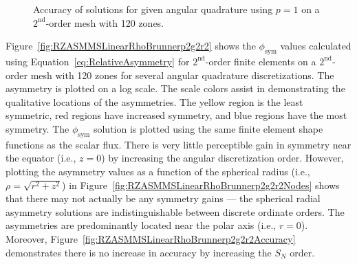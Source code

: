 \documentclass[12pt]{article}
\begin{document}
\begin{figure}[!htb]
\centering
{}
\caption{Accuracy of solutions for given angular quadrature using $p=1$ on a $2^\text{nd}$-order mesh with 120 zones.}
\label{fig:RZASMMSLinearRhoBrunnerp1g2r2Accuracy}
\end{figure}

\FloatBarrier

Figure~\ref{fig:RZASMMSLinearRhoBrunnerp2g2r2} shows the $\phi_\text{sym}$ values calculated using Equation~\ref{eq:RelativeAsymmetry} for $2^\text{nd}$-order finite elements on a $2^\text{nd}$-order mesh with 120 zones for several angular quadrature discretizations. The asymmetry is plotted on a log scale. The scale colors assist in demonstrating the qualitative locations of the asymmetries. The yellow region is the least symmetric, red regions have increased symmetry, and blue regions have the most symmetry. The $\phi_\text{sym}$ solution is plotted using the same finite element shape functions as the scalar flux. There is very little perceptible gain in symmetry near the equator (i.e., $z=0$) by increasing the angular discretization order. However, plotting the asymmetry values as a function of the spherical radius (i.e., $\rho=\sqrt{r^2+z^2}$) in Figure~\ref{fig:RZASMMSLinearRhoBrunnerp2g2r2Nodes} shows that there may not actually be any symmetry gains --- the spherical radial asymmetry solutions are indistinguishable between discrete ordinate orders. The asymmetries are predominantly located near the polar axis (i.e., $r=0$). Moreover, Figure~\ref{fig:RZASMMSLinearRhoBrunnerp2g2r2Accuracy} demonstrates there is no increase in accuracy by increasing the $S_N$ order.
\end{document}

